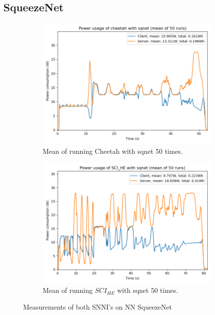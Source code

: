 \documentclass[../thesis.tex]{subfiles}
\begin{document}
\subsection{SqueezeNet}\label{subsection:sqnet}
\begin{figure}[bh!]
    \begin{subfigure}{.475\linewidth}
            \includegraphics[width=\textwidth]{Thesis/Images/Means/mean_cheetah-sqnet.png}
            \caption{Mean of running Cheetah with sqnet 50 times.}
            \label{fig:mean_cheetah_sqnet}
    \end{subfigure}\hfill %
    \begin{subfigure}{.475\linewidth}
            \includegraphics[width=\textwidth]{Thesis/Images/Means/mean_SCI_HE-sqnet.png}
            \caption{Mean of running $SCI_{HE}$ with sqnet 50 times.}
            \label{fig:mean_SCI_HE_sqnet}
    \end{subfigure}

    \caption{Measurements of both SNNI's on NN SqueezeNet}
\end{figure}
\end{document}
